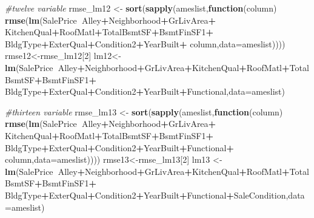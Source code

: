 \documentclass[]{article}
\newenvironment{Shaded}{\begin{snugshade}}{\end{snugshade}}
\newcommand{\CommentTok}[1]{\textcolor[rgb]{0.56,0.35,0.01}{\textit{#1}}}
\newcommand{\ControlFlowTok}[1]{\textcolor[rgb]{0.13,0.29,0.53}{\textbf{#1}}}
\newcommand{\DataTypeTok}[1]{\textcolor[rgb]{0.13,0.29,0.53}{#1}}
\newcommand{\DecValTok}[1]{\textcolor[rgb]{0.00,0.00,0.81}{#1}}
\newcommand{\KeywordTok}[1]{\textcolor[rgb]{0.13,0.29,0.53}{\textbf{#1}}}
\newcommand{\NormalTok}[1]{#1}
\newcommand{\OperatorTok}[1]{\textcolor[rgb]{0.81,0.36,0.00}{\textbf{#1}}}
\newcommand{\StringTok}[1]{\textcolor[rgb]{0.31,0.60,0.02}{#1}}
\begin{document}
\begin{Shaded}
\begin{Highlighting}[]
\CommentTok{#twelve variable}
\NormalTok{rmse_lm12 <-}\StringTok{ }\KeywordTok{sort}\NormalTok{(}\KeywordTok{sapply}\NormalTok{(ameslist,}\ControlFlowTok{function}\NormalTok{(column) }\KeywordTok{rmse}\NormalTok{(}\KeywordTok{lm}\NormalTok{(SalePrice}\OperatorTok{~}\NormalTok{Alley}\OperatorTok{+}\NormalTok{Neighborhood}\OperatorTok{+}\NormalTok{GrLivArea}\OperatorTok{+}
\StringTok{                                                             }\NormalTok{KitchenQual}\OperatorTok{+}\NormalTok{RoofMatl}\OperatorTok{+}\NormalTok{TotalBsmtSF}\OperatorTok{+}\NormalTok{BsmtFinSF1}\OperatorTok{+}
\StringTok{                                                             }\NormalTok{BldgType}\OperatorTok{+}\NormalTok{ExterQual}\OperatorTok{+}\NormalTok{Condition2}\OperatorTok{+}\NormalTok{YearBuilt}\OperatorTok{+}
\StringTok{                                                             }\NormalTok{column,}\DataTypeTok{data=}\NormalTok{ameslist))))}
\NormalTok{rmse12<-rmse_lm12[}\DecValTok{2}\NormalTok{]}
\NormalTok{lm12<-}\StringTok{ }\KeywordTok{lm}\NormalTok{(SalePrice}\OperatorTok{~}\NormalTok{Alley}\OperatorTok{+}\NormalTok{Neighborhood}\OperatorTok{+}\NormalTok{GrLivArea}\OperatorTok{+}\NormalTok{KitchenQual}\OperatorTok{+}\NormalTok{RoofMatl}\OperatorTok{+}\NormalTok{TotalBsmtSF}\OperatorTok{+}\NormalTok{BsmtFinSF1}\OperatorTok{+}
\StringTok{            }\NormalTok{BldgType}\OperatorTok{+}\NormalTok{ExterQual}\OperatorTok{+}\NormalTok{Condition2}\OperatorTok{+}\NormalTok{YearBuilt}\OperatorTok{+}\NormalTok{Functional,}\DataTypeTok{data=}\NormalTok{ameslist)}

\CommentTok{#thirteen variable}
\NormalTok{rmse_lm13 <-}\StringTok{ }\KeywordTok{sort}\NormalTok{(}\KeywordTok{sapply}\NormalTok{(ameslist,}\ControlFlowTok{function}\NormalTok{(column) }\KeywordTok{rmse}\NormalTok{(}\KeywordTok{lm}\NormalTok{(SalePrice}\OperatorTok{~}\NormalTok{Alley}\OperatorTok{+}\NormalTok{Neighborhood}\OperatorTok{+}\NormalTok{GrLivArea}\OperatorTok{+}
\StringTok{                                                             }\NormalTok{KitchenQual}\OperatorTok{+}\NormalTok{RoofMatl}\OperatorTok{+}\NormalTok{TotalBsmtSF}\OperatorTok{+}\NormalTok{BsmtFinSF1}\OperatorTok{+}
\StringTok{                                                             }\NormalTok{BldgType}\OperatorTok{+}\NormalTok{ExterQual}\OperatorTok{+}\NormalTok{Condition2}\OperatorTok{+}\NormalTok{YearBuilt}\OperatorTok{+}\NormalTok{Functional}\OperatorTok{+}
\StringTok{                                                             }\NormalTok{column,}\DataTypeTok{data=}\NormalTok{ameslist))))}
\NormalTok{rmse13<-rmse_lm13[}\DecValTok{2}\NormalTok{]}
\NormalTok{lm13 <-}\StringTok{ }\KeywordTok{lm}\NormalTok{(SalePrice}\OperatorTok{~}\NormalTok{Alley}\OperatorTok{+}\NormalTok{Neighborhood}\OperatorTok{+}\NormalTok{GrLivArea}\OperatorTok{+}\NormalTok{KitchenQual}\OperatorTok{+}\NormalTok{RoofMatl}\OperatorTok{+}\NormalTok{TotalBsmtSF}\OperatorTok{+}\NormalTok{BsmtFinSF1}\OperatorTok{+}
\StringTok{             }\NormalTok{BldgType}\OperatorTok{+}\NormalTok{ExterQual}\OperatorTok{+}\NormalTok{Condition2}\OperatorTok{+}\NormalTok{YearBuilt}\OperatorTok{+}\NormalTok{Functional}\OperatorTok{+}\NormalTok{SaleCondition,}\DataTypeTok{data=}\NormalTok{ameslist)}


\end{Highlighting}
\end{Shaded}
\end{document}
